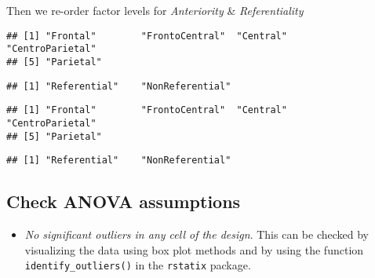 \documentclass[
]{article}
\providecommand{\tightlist}{%
  \setlength{\itemsep}{0pt}\setlength{\parskip}{0pt}}
\begin{document}
Then we re-order factor levels for \emph{Anteriority} \&
\emph{Referentiality}

\begin{verbatim}
## [1] "Frontal"        "FrontoCentral"  "Central"        "CentroParietal"
## [5] "Parietal"
\end{verbatim}

\begin{verbatim}
## [1] "Referential"    "NonReferential"
\end{verbatim}

\begin{verbatim}
## [1] "Frontal"        "FrontoCentral"  "Central"        "CentroParietal"
## [5] "Parietal"
\end{verbatim}

\begin{verbatim}
## [1] "Referential"    "NonReferential"
\end{verbatim}

\subsection{Check ANOVA assumptions}\label{check-anova-assumptions}

\begin{itemize}
\tightlist
\item
  \emph{No significant outliers in any cell of the design}. This can be
  checked by visualizing the data using box plot methods and by using
  the function \texttt{identify\_outliers()} in the \texttt{rstatix}
  package.
\end{itemize}
\end{document}
